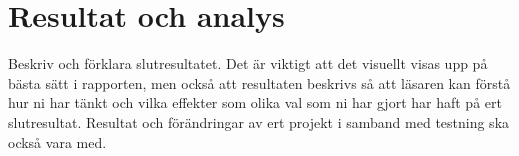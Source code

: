\section{Resultat och analys}
Beskriv och förklara slutresultatet. Det är viktigt att det visuellt visas upp på bästa sätt i rapporten, men också att resultaten beskrivs så att läsaren kan förstå hur ni har tänkt och vilka effekter som olika val som ni har gjort har haft på ert slutresultat. Resultat och förändringar av ert projekt i samband med testning ska också vara med.